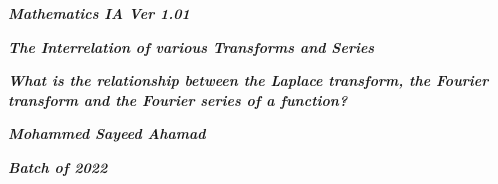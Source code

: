 

\begin{titlepage}
    \begin{center}
            
        \date{}
            
        \huge
            
        \textit{\textbf{Mathematics IA Ver 1.01}}
            
        \vspace{0.25cm}
            
        \hline
            
        \vspace{2.5cm}
            
        \textit{\textbf{The Interrelation of various Transforms and Series}}
            
        \vspace{1cm}
            
        \LARGE
            
        \textit{\textbf{What is the relationship between the Laplace transform, the Fourier transform and the Fourier series of a function? }}
            
        \vspace{2.5cm}
            
        \Large
            
        \textit{\textbf{Mohammed Sayeed Ahamad}}
            
        \vspace{4cm}
            
        \Large
            
        \textit{\textbf{Batch of 2022}}
            
        \vspace{0.25cm}
            
        \hline
           
            
    \end{center}
\end{titlepage}



